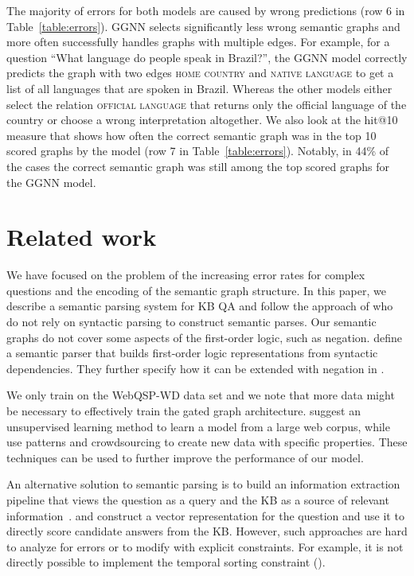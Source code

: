 \documentclass[11pt]{article}
\begin{document}
The majority of errors for both models are caused by wrong predictions (row 6 in Table~\ref{table:errors}). GGNN selects significantly less wrong semantic graphs and more often successfully handles graphs with multiple edges. For example, for a question ``What language do people speak in Brazil?'', the GGNN model correctly predicts the graph with two edges \textsc{home country} and \textsc{native language} to get a list of all languages that are spoken in Brazil. Whereas the other models either select the relation \textsc{official language} that returns only the official language of the country or choose a wrong interpretation altogether.
We also look at the hit@10 measure that shows how often the correct semantic graph was in the top 10 scored graphs by the model (row 7 in Table~\ref{table:errors}). Notably, in 44\% of the cases the correct semantic graph was still among the top scored graphs for the GGNN model. 




\section{Related work} 

We have focused on the problem of the increasing error rates for complex questions and the encoding of the semantic graph structure. 
In this paper, we describe a semantic parsing system for KB QA and follow the approach of  who do not rely on syntactic parsing to construct semantic parses. Our semantic graphs do not cover some aspects of the first-order logic, such as negation. 
 define a semantic parser that builds first-order logic representations from syntactic dependencies. They further specify how it can be extended with negation in \mbox{}.

We only train on the WebQSP-WD data set and we note that more data might be necessary to effectively train the gated graph architecture.  suggest an unsupervised learning method to learn a model from a large web corpus, while  use patterns and crowdsourcing to create new data with specific properties. These techniques can be used to further improve the performance of our model.

An alternative solution to semantic parsing is to build an information extraction pipeline that views the question as a query and the KB as a source of relevant information~\cite{Yao2014a}.  and  construct a vector representation for the question and use it to directly score candidate answers from the KB. However, such approaches are hard to analyze for errors or to modify with explicit constraints. For example, it is not directly possible to implement the temporal sorting constraint ().
\end{document}
